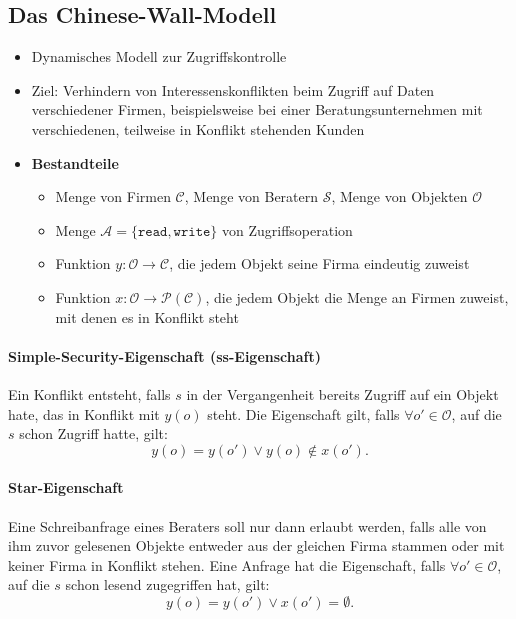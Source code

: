 \subsection{Das Chinese-Wall-Modell}
\begin{itemize}
	\item Dynamisches Modell zur Zugriffskontrolle
	\item Ziel: Verhindern von Interessenskonflikten beim Zugriff auf Daten verschiedener Firmen, beispielsweise bei einer Beratungsunternehmen mit verschiedenen, teilweise in Konflikt stehenden Kunden
	\item \textbf{Bestandteile}
	\begin{itemize}
		\item Menge von Firmen \(\mathcal{C}\), Menge von Beratern \(\mathcal{S}\), Menge von Objekten \(\mathcal{O}\)
		\item Menge \(\mathcal{A} = \{\texttt{read},\texttt{write}\}\) von Zugriffsoperation
		\item Funktion \(y: \mathcal{O} \rightarrow \mathcal{C}\), die jedem Objekt seine Firma eindeutig zuweist
		\item Funktion \(x: \mathcal{O} \rightarrow \mathcal{P}(\mathcal{C})\), die jedem Objekt die Menge an Firmen zuweist, mit denen es in Konflikt steht
	\end{itemize}
\end{itemize}

\paragraph{Simple-Security-Eigenschaft (ss-Eigenschaft)}
Ein Konflikt entsteht, falls \(s\) in der Vergangenheit bereits Zugriff auf ein Objekt hate, das in Konflikt mit \(y(o)\) steht. Die Eigenschaft gilt, falls \(\forall o' \in \mathcal{O}\), auf die \(s\) schon Zugriff hatte, gilt:
\[y(o) = y(o') \vee y(o) \notin x(o').\]

\paragraph{Star-Eigenschaft}
Eine Schreibanfrage eines Beraters soll nur dann erlaubt werden, falls alle von ihm zuvor gelesenen Objekte entweder aus der gleichen Firma stammen oder mit keiner Firma in Konflikt stehen. Eine Anfrage hat die Eigenschaft, falls \(\forall o' \in \mathcal{O}\), auf die \(s\) schon lesend zugegriffen hat, gilt:
\[y(o) = y(o') \vee x(o') = \emptyset.\]



